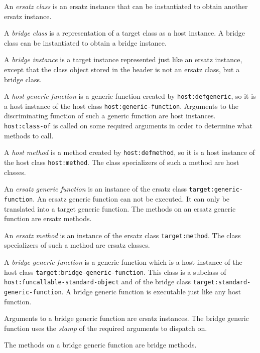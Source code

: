 \begin{definition}
An \emph{ersatz class} is an ersatz instance that can be instantiated
to obtain another ersatz instance.
\end{definition}

\begin{definition}
A \emph{bridge class} is a representation of a target class as a host
instance.  A bridge class can be instantiated to obtain a bridge
instance. 
\end{definition}

\begin{definition}
A \emph{bridge instance} is a target instance represented just like an
ersatz instance, except that the class object stored in the header is
not an ersatz class, but a bridge class. 
\end{definition}

\begin{definition}
A \emph{host generic function} is a generic function created by
\texttt{host:defgeneric}, so it is a host instance of the host class
\texttt{host:generic-function}.  Arguments to the discriminating
function of such a generic function are host instances.
\texttt{host:class-of} is called on some required arguments in order
to determine what methods to call.
\end{definition}

\begin{definition}
A \emph{host method} is a method created by \texttt{host:defmethod},
so it is a host instance of the host class \texttt{host:method}.  The
class specializers of such a method are host classes.
\end{definition}

\begin{definition}
An \emph{ersatz generic function} is an instance of the ersatz class
\texttt{target:generic-function}.  An ersatz generic function can not
be executed.  It can only be translated into a target generic function.
The methods on an ersatz generic function are ersatz methods. 
\end{definition}

\begin{definition}
An \emph{ersatz method} is an instance of the ersatz class
\texttt{target:method}.  The class specializers of such a method are
ersatz classes.
\end{definition}

\begin{definition}
A \emph{bridge generic function} is a generic function which is a host
instance of the host class \texttt{target:bridge-generic-function}.
This class is a subclass of \texttt{host:funcallable-standard-object}
and of the bridge class \texttt{target:standard-generic-function}.
A bridge generic function is executable just like any host function.

Arguments to a bridge generic function are ersatz instances.  The
bridge generic function uses the 
\emph{stamp}
 of
the required arguments to dispatch on. 

The methods on a bridge generic function are bridge methods.
\end{definition}

